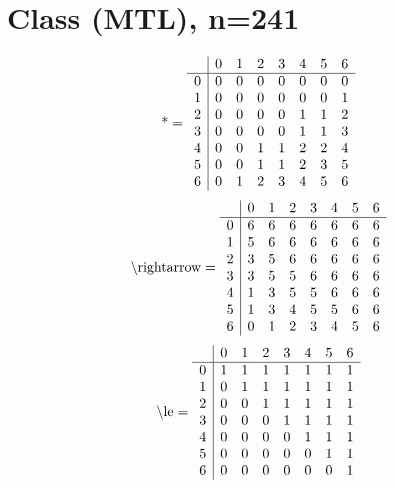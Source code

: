 \documentclass[11pt]{article}
\begin{document}
\section{Class (MTL), n=241}
\[\text{*} = 
\begin{array}{r | r r r r r r r}
 & 0 & 1 & 2 & 3 & 4 & 5 & 6 \\ \hline
0 & 0 & 0 & 0 & 0 & 0 & 0 & 0 \\
1 & 0 & 0 & 0 & 0 & 0 & 0 & 1 \\
2 & 0 & 0 & 0 & 0 & 1 & 1 & 2 \\
3 & 0 & 0 & 0 & 0 & 1 & 1 & 3 \\
4 & 0 & 0 & 1 & 1 & 2 & 2 & 4 \\
5 & 0 & 0 & 1 & 1 & 2 & 3 & 5 \\
6 & 0 & 1 & 2 & 3 & 4 & 5 & 6 \\
\end{array}
\]
\[\text{\textbackslash rightarrow} = 
\begin{array}{r | r r r r r r r}
 & 0 & 1 & 2 & 3 & 4 & 5 & 6 \\ \hline
0 & 6 & 6 & 6 & 6 & 6 & 6 & 6 \\
1 & 5 & 6 & 6 & 6 & 6 & 6 & 6 \\
2 & 3 & 5 & 6 & 6 & 6 & 6 & 6 \\
3 & 3 & 5 & 5 & 6 & 6 & 6 & 6 \\
4 & 1 & 3 & 5 & 5 & 6 & 6 & 6 \\
5 & 1 & 3 & 4 & 5 & 5 & 6 & 6 \\
6 & 0 & 1 & 2 & 3 & 4 & 5 & 6 \\
\end{array}
\]
\[\text{\textbackslash le} = 
\begin{array}{r | r r r r r r r}
 & 0 & 1 & 2 & 3 & 4 & 5 & 6 \\ \hline
0 & 1 & 1 & 1 & 1 & 1 & 1 & 1 \\
1 & 0 & 1 & 1 & 1 & 1 & 1 & 1 \\
2 & 0 & 0 & 1 & 1 & 1 & 1 & 1 \\
3 & 0 & 0 & 0 & 1 & 1 & 1 & 1 \\
4 & 0 & 0 & 0 & 0 & 1 & 1 & 1 \\
5 & 0 & 0 & 0 & 0 & 0 & 1 & 1 \\
6 & 0 & 0 & 0 & 0 & 0 & 0 & 1 \\
\end{array}
\]
\end{document}
